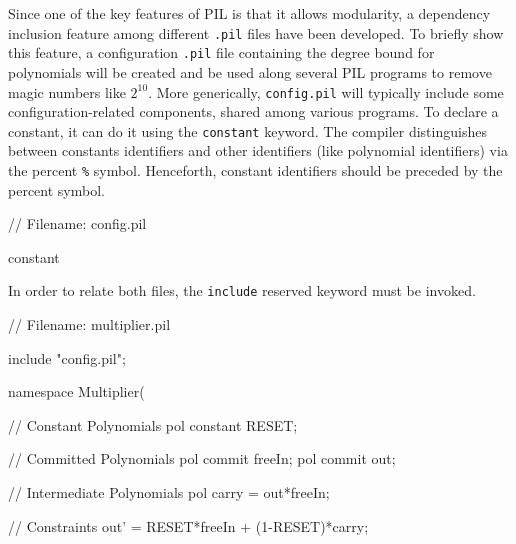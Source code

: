 Since one of the key features of PIL is that it allows modularity, a dependency inclusion feature among different \texttt{.pil} files have been developed. To briefly show this feature, a configuration \texttt{.pil} file containing the degree bound for polynomials will be created and be used along several PIL programs to remove magic numbers like $2^{10}$. More generically, \texttt{config.pil} will typically include some configuration-related components, shared among various programs. To declare a constant, it can do it using the \texttt{constant} keyword. The compiler distinguishes between constants identifiers and other identifiers (like polynomial identifiers) via the percent \texttt{\%} symbol. Henceforth, constant identifiers should be preceded by the percent symbol. 

\begin{pil}
    // Filename: config.pil
    
    constant %
\end{pil}

In order to relate both files, the \texttt{include} reserved keyword must be invoked.

\begin{pil}
    // Filename: multiplier.pil
    
    include "config.pil";
    
    namespace Multiplier(%
    
    // Constant Polynomials
    pol constant RESET;
    
    // Committed Polynomials
    pol commit freeIn;
    pol commit out;
    
    // Intermediate Polynomials
    pol carry = out*freeIn;
    
    // Constraints
    out' = RESET*freeIn + (1-RESET)*carry;
\end{pil}








